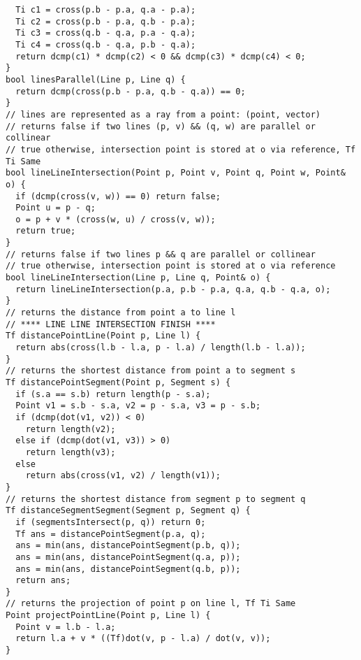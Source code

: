 \documentclass[FSZ,a4paper,onesided]{article}
\begin{document}
\begin{multicols*}{\COLS}
\begin{lstlisting}
  Ti c1 = cross(p.b - p.a, q.a - p.a);
  Ti c2 = cross(p.b - p.a, q.b - p.a);
  Ti c3 = cross(q.b - q.a, p.a - q.a);
  Ti c4 = cross(q.b - q.a, p.b - q.a);
  return dcmp(c1) * dcmp(c2) < 0 && dcmp(c3) * dcmp(c4) < 0;
}
bool linesParallel(Line p, Line q) {
  return dcmp(cross(p.b - p.a, q.b - q.a)) == 0;
}
// lines are represented as a ray from a point: (point, vector)
// returns false if two lines (p, v) && (q, w) are parallel or collinear
// true otherwise, intersection point is stored at o via reference, Tf Ti Same
bool lineLineIntersection(Point p, Point v, Point q, Point w, Point& o) {
  if (dcmp(cross(v, w)) == 0) return false;
  Point u = p - q;
  o = p + v * (cross(w, u) / cross(v, w));
  return true;
}
// returns false if two lines p && q are parallel or collinear
// true otherwise, intersection point is stored at o via reference
bool lineLineIntersection(Line p, Line q, Point& o) {
  return lineLineIntersection(p.a, p.b - p.a, q.a, q.b - q.a, o);
}
// returns the distance from point a to line l
// **** LINE LINE INTERSECTION FINISH ****
Tf distancePointLine(Point p, Line l) {
  return abs(cross(l.b - l.a, p - l.a) / length(l.b - l.a));
}
// returns the shortest distance from point a to segment s
Tf distancePointSegment(Point p, Segment s) {
  if (s.a == s.b) return length(p - s.a);
  Point v1 = s.b - s.a, v2 = p - s.a, v3 = p - s.b;
  if (dcmp(dot(v1, v2)) < 0)
    return length(v2);
  else if (dcmp(dot(v1, v3)) > 0)
    return length(v3);
  else
    return abs(cross(v1, v2) / length(v1));
}
// returns the shortest distance from segment p to segment q
Tf distanceSegmentSegment(Segment p, Segment q) {
  if (segmentsIntersect(p, q)) return 0;
  Tf ans = distancePointSegment(p.a, q);
  ans = min(ans, distancePointSegment(p.b, q));
  ans = min(ans, distancePointSegment(q.a, p));
  ans = min(ans, distancePointSegment(q.b, p));
  return ans;
}
// returns the projection of point p on line l, Tf Ti Same
Point projectPointLine(Point p, Line l) {
  Point v = l.b - l.a;
  return l.a + v * ((Tf)dot(v, p - l.a) / dot(v, v));
}
\end{lstlisting}

\end{multicols*}
\end{document}
